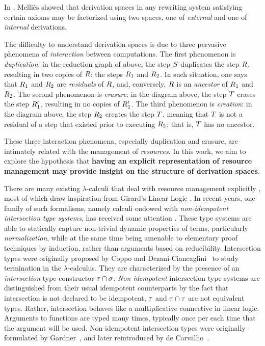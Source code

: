 In \cite{DBLP:conf/ctcs/Mellies97}, Melli\`es showed that
derivation spaces in any rewriting system satisfying certain axioms
may be factorized using two spaces,
one of {\em external} and one of {\em internal} derivations.



The difficulty to understand derivation spaces is due to three pervasive phenomena
of \emph{interaction} between computations.
The first phenomenon is \emph{duplication}:
in the reduction graph of above, the step $S$ duplicates the step $R$,
resulting in two copies of $R$: the steps $R_1$ and $R_2$.
In such situation, one says that $R_1$ and $R_2$ are \emph{residuals} of $R$,
and, conversely, $R$ is an \emph{ancestor} of $R_1$ and $R_2$.
The second phenomenon is \emph{erasure}:
in the diagram above, the step $T$ erases the step $R'_1$,
resulting in no copies of $R'_1$.
The third phenomenon is \emph{creation}:
in the diagram above, the step $R_2$ creates the step $T$,
meaning that $T$ is not a residual of a step that existed prior
to executing $R_2$; that is, $T$ has no ancestor.

These three interaction phenomena, especially duplication and erasure,
are intimately related with the management of \emph{resources}.
In this work, we aim to explore the hypothesis that {\bf having an explicit
representation of resource management may provide insight on
the structure of derivation spaces}.

There are many existing $\lambda$-calculi that deal with resource management explicitly
\cite{boudol1993lambda,ehrhard2003differential,kesner2007resource,kesner2009prismoid},
most of which draw inspiration from Girard's Linear Logic \cite{girard1987linear}.
In recent years, one family of such formalisms, namely calculi endowed with
{\em non-idempotent intersection type systems},
has received some attention
\cite{ehrhard2012collapsing,bernadet2013non,bucciarelli2014inhabitation,bucciarelli2017non,kesner2016reasoning,thesisvial,KRV18}.
These type systems are able to statically capture non-trivial
dynamic properties of terms, particularly {\em normalization},
while at the same time being amenable to elementary proof techniques by induction,
rather than arguments based on reducibility.
Intersection types were originally proposed by
Coppo and Dezani-Ciancaglini~\cite{DBLP:journals/aml/CoppoD78}
to study termination in the $\lambda$-calculus.
They are characterized by the presence of an {\em intersection} type constructor $\tau \cap \sigma$.
{\em Non-idempotent} intersection type systems are distinguished from their usual idempotent
counterparts by the fact that intersection
is not declared to be idempotent, \ie $\tau$ and $\tau \cap \tau$ are not equivalent types.
Rather, intersection behaves like a multiplicative connective in linear logic.
Arguments to functions are typed many times, typically once
per each time that the argument will be used.
Non-idempotent intersection types were originally formulated by
Gardner~\cite{gardner1994discovering},
and later reintroduced by de Carvalho~\cite{carvalho2007semantiques}.

